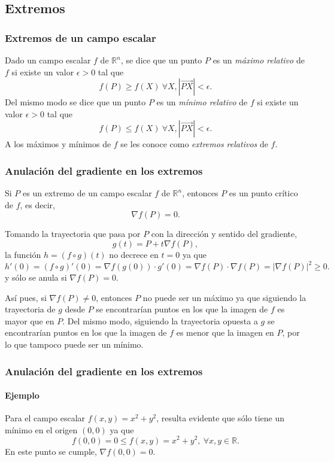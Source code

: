 \subsection{Extremos}
\begin{frame}
	\frametitle{Extremos de un campo escalar}
	\begin{definicion}
		Dado un campo escalar $f$ de $\mathbb{R}^n$, se dice que un punto $P$ es un \emph{máximo relativo} de $f$ si existe un valor $\epsilon>0$ tal que
		\[
			f(P)\geq f(X)\ \forall X, |\vec{PX}|<\epsilon.
		\] 
		Del mismo modo se dice que un punto $P$ es un \emph{mínimo relativo} de $f$ si existe un valor $\epsilon>0$ tal que
		\[
			f(P)\leq f(X)\ \forall X, |\vec{PX}|<\epsilon.
		\] 
		A los máximos y mínimos de $f$ se les conoce como \emph{extremos relativos} de $f$.
	\end{definicion}
\end{frame}


\begin{frame}
	\frametitle{Anulación del gradiente en los extremos}
	\begin{teorema}
		Si $P$ es un extremo de un campo escalar $f$ de $\mathbb{R}^n$, entonces $P$ es un punto crítico de $f$, es decir,
		\[
			\nabla f(P) = 0.
		\]
	\end{teorema}
	
	 Tomando la trayectoria que pasa por $P$ con la dirección y sentido del gradiente,
	\[
		g(t)=P+t\nabla f(P),
	\] 
	la función $h=(f\circ g)(t)$ no decrece en $t=0$ ya que 
	\[
		h'(0)= (f\circ g)'(0) = \nabla f(g(0))\cdot g'(0) = \nabla f(P)\cdot \nabla f(P) = |\nabla f(P)|^2\geq 0.
	\]
	y sólo se anula si $\nabla f(P)=0$.
	
	Así pues, si $\nabla f(P)\neq 0$, entonces $P$ no puede ser un máximo ya que siguiendo la trayectoria de $g$ desde $P$ se encontrarían puntos en los que la imagen de $f$ es mayor que en $P$.
	Del mismo modo, siguiendo la trayectoria opuesta a $g$ se encontrarían puntos en los que la imagen de $f$ es menor que la imagen en $P$, por lo que tampoco puede ser un mínimo. 
\end{frame}


\begin{frame}
	\frametitle{Anulación del gradiente en los extremos}
	\framesubtitle{Ejemplo}
	Para el campo escalar $f(x,y)=x^2+y^2$, resulta evidente que sólo tiene un mínimo en el origen $(0,0)$ ya que 
	\[
		f(0,0)=0 \leq f(x,y)=x^2+y^2,\ \forall x,y\in \mathbb{R}.
	\]
	En este punto se cumple, $\nabla f(0,0) = 0$.
	\begin{center}
		\scalebox{1}{}
	\end{center}
\end{frame}



